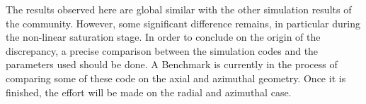   The results observed here are global similar with the other simulation results of the community.
  However, some significant difference remains, in particular during the non-linear saturation stage.
  In order to conclude on the origin of the discrepancy, a precise comparison between the simulation codes and the parameters used should be done.
  A Benchmark is currently in the process of comparing some of these code on the axial and azimuthal geometry.
  Once it is finished, the effort will be made on the radial and azimuthal case.
  
  
